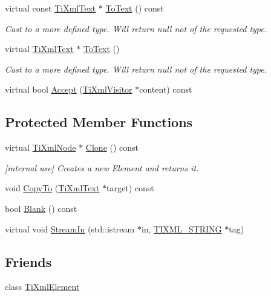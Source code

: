\begin{DoxyCompactItemize}
\item 
virtual const \hyperlink{class_ti_xml_text}{Ti\-Xml\-Text} $\ast$ \hyperlink{class_ti_xml_text_a895bf34ffad17f7439ab2a52b9651648}{To\-Text} () const 
\begin{DoxyCompactList}\small\item\em Cast to a more defined type. Will return null not of the requested type. \end{DoxyCompactList}\item 
virtual \hyperlink{class_ti_xml_text}{Ti\-Xml\-Text} $\ast$ \hyperlink{class_ti_xml_text_ae7c3a8fd3e4dbf6c0c4363a943d72f5b}{To\-Text} ()
\begin{DoxyCompactList}\small\item\em Cast to a more defined type. Will return null not of the requested type. \end{DoxyCompactList}\item 
virtual bool \hyperlink{class_ti_xml_text_a43b9954ebf679557fac1a4453f337b7c}{Accept} (\hyperlink{class_ti_xml_visitor}{Ti\-Xml\-Visitor} $\ast$content) const 
\end{DoxyCompactItemize}
\subsection*{Protected Member Functions}
\begin{DoxyCompactItemize}
\item 
virtual \hyperlink{class_ti_xml_node}{Ti\-Xml\-Node} $\ast$ \hyperlink{class_ti_xml_text_adde1869dfb029be50713fbfd8ce4d21f}{Clone} () const 
\begin{DoxyCompactList}\small\item\em \mbox{[}internal use\mbox{]} Creates a new Element and returns it. \end{DoxyCompactList}\item 
void \hyperlink{class_ti_xml_text_adcec7d9b6fccfc5777452bb97e6031c1}{Copy\-To} (\hyperlink{class_ti_xml_text}{Ti\-Xml\-Text} $\ast$target) const 
\item 
bool \hyperlink{class_ti_xml_text_a1c120428e3b3cf24d79706e6d2b65aa6}{Blank} () const 
\item 
virtual void \hyperlink{class_ti_xml_text_a261e07cdbd5363f994371320414c17d9}{Stream\-In} (std\-::istream $\ast$in, \hyperlink{tinyxml_8h_a92bada05fd84d9a0c9a5bbe53de26887}{T\-I\-X\-M\-L\-\_\-\-S\-T\-R\-I\-N\-G} $\ast$tag)
\end{DoxyCompactItemize}
\subsection*{Friends}
\begin{DoxyCompactItemize}
\item 
class \hyperlink{class_ti_xml_text_ab6592e32cb9132be517cc12a70564c4b}{Ti\-Xml\-Element}
\end{DoxyCompactItemize}
